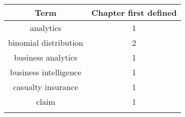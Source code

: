 \documentclass[]{book}
\theoremstyle{definition}
\theoremstyle{definition}
\theoremstyle{definition}
\theoremstyle{remark}
\begin{document}
\begin{longtable}[]{@{}cc@{}}
\toprule
\begin{minipage}[b]{0.43\columnwidth}\centering\strut
Term\strut
\end{minipage} & \begin{minipage}[b]{0.30\columnwidth}\centering\strut
Chapter first defined\strut
\end{minipage}\tabularnewline
\midrule
\endhead
\begin{minipage}[t]{0.43\columnwidth}\centering\strut
analytics\strut
\end{minipage} & \begin{minipage}[t]{0.30\columnwidth}\centering\strut
1\strut
\end{minipage}\tabularnewline
\begin{minipage}[t]{0.43\columnwidth}\centering\strut
binomial distribution\strut
\end{minipage} & \begin{minipage}[t]{0.30\columnwidth}\centering\strut
2\strut
\end{minipage}\tabularnewline
\begin{minipage}[t]{0.43\columnwidth}\centering\strut
business analytics\strut
\end{minipage} & \begin{minipage}[t]{0.30\columnwidth}\centering\strut
1\strut
\end{minipage}\tabularnewline
\begin{minipage}[t]{0.43\columnwidth}\centering\strut
business intelligence\strut
\end{minipage} & \begin{minipage}[t]{0.30\columnwidth}\centering\strut
1\strut
\end{minipage}\tabularnewline
\begin{minipage}[t]{0.43\columnwidth}\centering\strut
casualty insurance\strut
\end{minipage} & \begin{minipage}[t]{0.30\columnwidth}\centering\strut
1\strut
\end{minipage}\tabularnewline
\begin{minipage}[t]{0.43\columnwidth}\centering\strut
claim\strut
\end{minipage} & \begin{minipage}[t]{0.30\columnwidth}\centering\strut
1\strut
\end{minipage}\tabularnewline
\begin{minipage}[t]{0.43\columnwidth}\centering\strut

\end{minipage}
\end{longtable}
\end{document}
